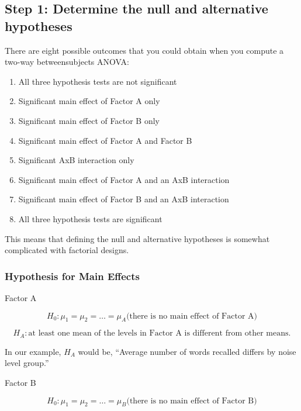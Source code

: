 \documentclass[
  letterpaper,
  DIV=11,
  numbers=noendperiod]{scrreprt}
\begin{document}
\subsection*{Step 1: Determine the null and alternative
hypotheses}\label{step-1-determine-the-null-and-alternative-hypotheses}

There are eight possible outcomes that you could obtain when you compute
a two-way betweensubjects ANOVA:

\begin{enumerate}
\def\labelenumi{\arabic{enumi}.}
\item
  All three hypothesis tests are not significant
\item
  Significant main effect of Factor A only
\item
  Significant main effect of Factor B only
\item
  Significant main effect of Factor A and Factor B
\item
  Significant AxB interaction only
\item
  Significant main effect of Factor A and an AxB interaction
\item
  Significant main effect of Factor B and an AxB interaction
\item
  All three hypothesis tests are significant
\end{enumerate}

This means that defining the null and alternative hypotheses is somewhat
complicated with factorial designs.

\subsubsection*{Hypothesis for Main
Effects}\label{hypothesis-for-main-effects}

Factor A

\[
H_0: \mu_1 = \mu_2 = … = \mu_A \text{(there is no main effect of Factor A)}
\]

\[
H_A: \text{at least one mean of the levels in Factor A is different from other means.}
\]

In our example, \(H_A\) would be, ``Average number of words recalled
differs by noise level group.''

Factor B

\[
H_0: \mu_1 = \mu_2 = … = \mu_B \text{(there is no main effect of Factor B)}
\]
\end{document}
